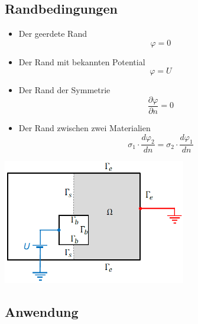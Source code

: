 \subsection{Randbedingungen}
\begin{minipage}{8cm}
	\begin{itemize}
		\item Der geerdete Rand \[\varphi = 0\]
		\item Der Rand mit bekannten Potential \[ \varphi = U \]
		\item Der Rand der Symmetrie \[ \dfrac{\partial\varphi}{\partial n} = 0\]
		\item Der Rand zwischen zwei Materialien \[\sigma_{1} \cdot \frac{d \varphi_{2}}{dn}=\sigma_{2} \cdot \frac{d \varphi_{1}}{dn}\]
	\end{itemize}
\end{minipage}
\begin{minipage}{8cm}
	\includegraphics[width=8cm]{images/randbedinung_ES.png}
\end{minipage}
\subsection{Anwendung}
\clearpage
\pagebreak